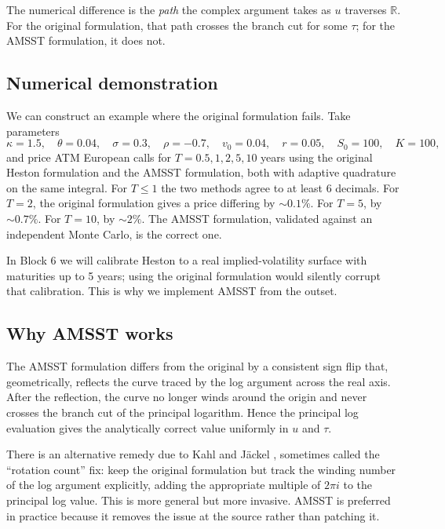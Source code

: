 \documentclass[11pt]{article}
\theoremstyle{plain}
\theoremstyle{definition}
\theoremstyle{remark}
\begin{document}
The numerical difference is the \emph{path} the complex argument takes as \(u\) traverses \(\mathbb{R}\). For the original formulation, that path crosses the branch cut for some \(\tau\); for the AMSST formulation, it does not.

\subsection{Numerical demonstration}

We can construct an example where the original formulation fails. Take parameters
\[
    \kappa = 1.5, \quad \theta = 0.04, \quad \sigma = 0.3, \quad \rho = -0.7, \quad v_0 = 0.04, \quad r = 0.05, \quad S_0 = 100, \quad K = 100,
\]
and price ATM European calls for \(T = 0.5, 1, 2, 5, 10\) years using the original Heston formulation and the AMSST formulation, both with adaptive quadrature on the same integral. For \(T \leq 1\) the two methods agree to at least 6 decimals. For \(T = 2\), the original formulation gives a price differing by \(\sim 0.1\%\). For \(T = 5\), by \(\sim 0.7\%\). For \(T = 10\), by \(\sim 2\%\). The AMSST formulation, validated against an independent Monte Carlo, is the correct one.

In Block 6 we will calibrate Heston to a real implied-volatility surface with maturities up to 5 years; using the original formulation would silently corrupt that calibration. This is why we implement AMSST from the outset.

\subsection{Why AMSST works}

The AMSST formulation differs from the original by a consistent sign flip that, geometrically, reflects the curve traced by the log argument across the real axis. After the reflection, the curve no longer winds around the origin and never crosses the branch cut of the principal logarithm. Hence the principal log evaluation gives the analytically correct value uniformly in \(u\) and \(\tau\).

There is an alternative remedy due to Kahl and J\"ackel \cite{KahlJaeckel2005}, sometimes called the ``rotation count'' fix: keep the original formulation but track the winding number of the log argument explicitly, adding the appropriate multiple of \(2\pi i\) to the principal log value. This is more general but more invasive. AMSST is preferred in practice because it removes the issue at the source rather than patching it.
\end{document}
